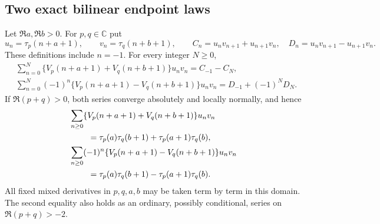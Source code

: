 \subsection{Two exact bilinear endpoint laws}

\begin{theorem}\label{bil:master}
Let $\Re a,\Re b>0$. For $p,q\in\mathbb C$ put
\[
 u_n=\tau_p(n+a+1),\qquad v_n=\tau_q(n+b+1),\qquad
 C_n=u_nv_{n+1}+u_{n+1}v_n,\quad
 D_n=u_nv_{n+1}-u_{n+1}v_n.
\]
These definitions include $n=-1$. For every integer $N\ge0$,
\begin{align}
 &\sum_{n=0}^{N}
 \{V_p(n+a+1)+V_q(n+b+1)\}u_nv_n
       =C_{-1}-C_N,\label{bil:finite-plus}\\
 &\sum_{n=0}^{N}(-1)^n
 \{V_p(n+a+1)-V_q(n+b+1)\}u_nv_n
       =D_{-1}+(-1)^ND_N.\label{bil:finite-minus}
\end{align}
If $\Re(p+q)>0$, both series converge absolutely and locally normally,
and hence
\begin{align}
 &\sum_{n\ge0}\{V_p(n+a+1)+V_q(n+b+1)\}u_nv_n\notag\\
 &\hspace{8mm}=\tau_p(a)\tau_q(b+1)+\tau_p(a+1)\tau_q(b),
                                      \label{bil:plus}\\
 &\sum_{n\ge0}(-1)^n\{V_p(n+a+1)-V_q(n+b+1)\}u_nv_n\notag\\
 &\hspace{8mm}=\tau_p(a)\tau_q(b+1)-\tau_p(a+1)\tau_q(b).
                                      \label{bil:minus}
\end{align}
All fixed mixed derivatives in $p,q,a,b$ may be taken term by term
in this domain. The second equality also holds as an ordinary,
possibly conditional, series on $\Re(p+q)>-2$.
\end{theorem}

